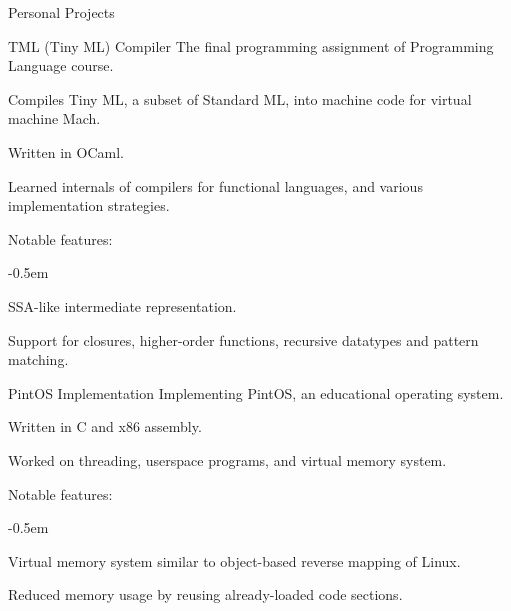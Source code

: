\documentclass{resume}
\begin{document}
\begin{res-section}{Personal Projects}
  \begin{res-subsection}{TML (Tiny ML) Compiler}{}
    The final programming assignment of Programming Language course.

    \item Compiles Tiny ML, a subset of Standard ML, into machine code for virtual machine \textsf{Mach}.

    \item Written in OCaml.

    \item Learned internals of compilers for functional languages, and various implementation strategies.

    \item Notable features:
    \vspace{-0.5em}
    \begin{list}{--}{}
      \itemsep -0.5em
      \item SSA-like intermediate representation.
      \item Support for closures, higher-order functions, recursive datatypes and pattern matching.
    \end{list}
  \end{res-subsection}

  \begin{res-subsection}{PintOS Implementation}{}
    Implementing PintOS, an educational operating system.

    \item Written in C and x86 assembly.

    \item Worked on threading, userspace programs, and virtual memory system.

    \item Notable features:
    \vspace{-0.5em}
    \begin{list}{--}{}
      \itemsep -0.5em
      \item Virtual memory system similar to object-based reverse mapping of Linux.
      \item Reduced memory usage by reusing already-loaded code sections.
    \end{list}
  \end{res-subsection}
\end{res-section}
\end{document}
